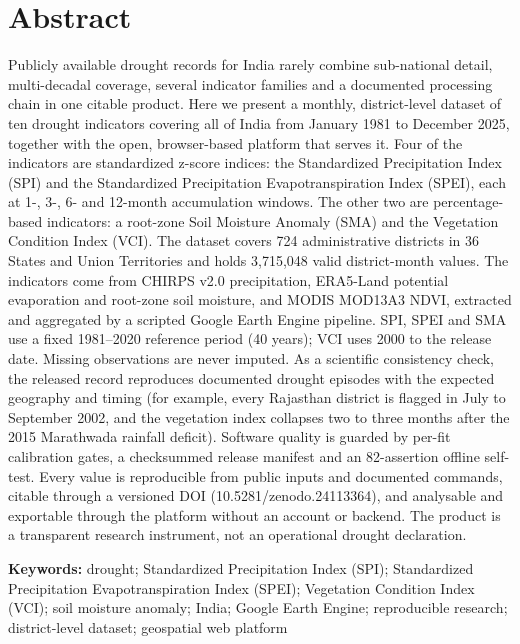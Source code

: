 \documentclass[10pt,a4paper]{article}
\begin{document}
\section*{Abstract}
Publicly available drought records for India rarely combine sub-national detail, multi-decadal coverage, several indicator families and a documented processing chain in one citable product. Here we present a monthly, district-level dataset of ten drought indicators covering all of India from January 1981 to December 2025, together with the open, browser-based platform that serves it. Four of the indicators are standardized z-score indices: the Standardized Precipitation Index (SPI) and the Standardized Precipitation Evapotranspiration Index (SPEI), each at 1-, 3-, 6- and 12-month accumulation windows. The other two are percentage-based indicators: a root-zone Soil Moisture Anomaly (SMA) and the Vegetation Condition Index (VCI). The dataset covers 724 administrative districts in 36 States and Union Territories and holds 3{,}715{,}048 valid district-month values. The indicators come from CHIRPS v2.0 precipitation, ERA5-Land potential evaporation and root-zone soil moisture, and MODIS MOD13A3 NDVI, extracted and aggregated by a scripted Google Earth Engine pipeline. SPI, SPEI and SMA use a fixed 1981--2020 reference period (40 years); VCI uses 2000 to the release date. Missing observations are never imputed. As a scientific consistency check, the released record reproduces documented drought episodes with the expected geography and timing (for example, every Rajasthan district is flagged in July to September 2002, and the vegetation index collapses two to three months after the 2015 Marathwada rainfall deficit). Software quality is guarded by per-fit calibration gates, a checksummed release manifest and an 82-assertion offline self-test. Every value is reproducible from public inputs and documented commands, citable through a versioned DOI (10.5281/zenodo.24113364), and analysable and exportable through the platform without an account or backend. The product is a transparent research instrument, not an operational drought declaration.

\vspace{8pt}
{\small\textbf{Keywords:} drought; Standardized Precipitation Index (SPI); Standardized Precipitation Evapotranspiration Index (SPEI); Vegetation Condition Index (VCI); soil moisture anomaly; India; Google Earth Engine; reproducible research; district-level dataset; geospatial web platform\par}
\end{document}
